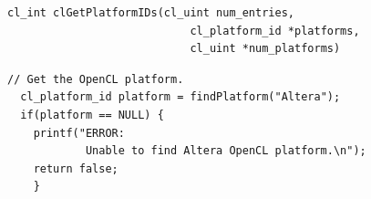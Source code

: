 \documentclass{article}
\begin{document}
  \begin{lstlisting}[title={Normal Use. Scarpino}]
    cl_int clGetPlatformIDs(cl_uint num_entries,
                            cl_platform_id *platforms,
                            cl_uint *num_platforms)
  \end{lstlisting}

  \begin{lstlisting}[title={VPNC use}]
  // Get the OpenCL platform.
  cl_platform_id platform = findPlatform("Altera");
  if(platform == NULL) {
    printf("ERROR:
            Unable to find Altera OpenCL platform.\n");
    return false;
    }
  \end{lstlisting}
\end{document}
